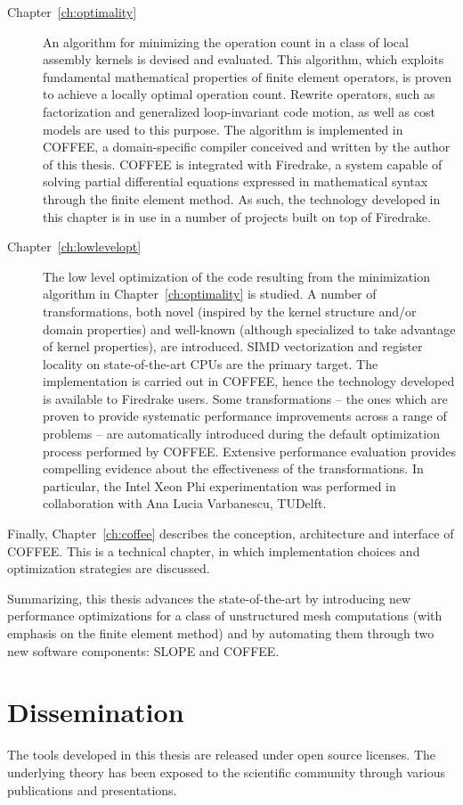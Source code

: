 \begin{description}
\item[Chapter~\ref{ch:optimality}] An algorithm for minimizing the operation count in a class of local assembly kernels is devised and evaluated. This algorithm, which exploits fundamental mathematical properties of finite element operators, is proven to achieve a locally optimal operation count. Rewrite operators, such as factorization and generalized loop-invariant code motion, as well as cost models are used to this purpose. The algorithm is implemented in COFFEE, a domain-specific compiler conceived and written by the author of this thesis. COFFEE is integrated with Firedrake, a system capable of solving partial differential equations expressed in mathematical syntax through the finite element method. As such, the technology developed in this chapter is in use in a number of projects built on top of Firedrake.

\item[Chapter~\ref{ch:lowlevelopt}] The low level optimization of the code resulting from the minimization algorithm in Chapter~\ref{ch:optimality} is studied. A number of transformations, both novel (inspired by the kernel structure and/or domain properties) and well-known (although specialized to take advantage of kernel properties), are introduced. SIMD vectorization and register locality on state-of-the-art CPUs are the primary target. The implementation is carried out in COFFEE, hence the technology developed is available to Firedrake users. Some transformations -- the ones which are proven to provide systematic performance improvements across a range of problems -- are automatically introduced during the default optimization process performed by COFFEE. Extensive performance evaluation provides compelling evidence about the effectiveness of the transformations. In particular, the Intel Xeon Phi experimentation was performed in collaboration with Ana Lucia Varbanescu, TUDelft.
\end{description}

Finally, Chapter~\ref{ch:coffee} describes the conception, architecture and interface of COFFEE. This is a technical chapter, in which implementation choices and optimization strategies are discussed.

Summarizing, this thesis advances the state-of-the-art by introducing new performance optimizations for a class of unstructured mesh computations (with emphasis on the finite element method) and by automating them through two new software components: SLOPE and COFFEE.


\section{Dissemination}
The tools developed in this thesis are released under open source licenses. The underlying theory has been exposed to the scientific community through various publications and presentations.

